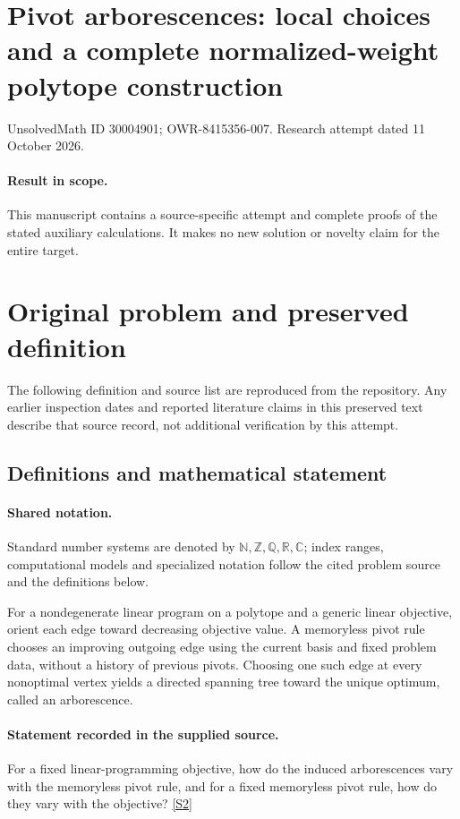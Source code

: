 \documentclass[11pt]{article}
\begin{document}
\section*{Pivot arborescences: local choices and a complete normalized-weight polytope construction}
\noindent UnsolvedMath ID 30004901; OWR-8415356-007. Research attempt dated 11 October 2026.
\paragraph{Result in scope.}This manuscript contains a source-specific attempt and complete proofs of the stated auxiliary calculations. It makes no new solution or novelty claim for the entire target.
\section{Original problem and preserved definition}
The following definition and source list are reproduced from the repository. Any earlier inspection dates and reported literature claims in this preserved text describe that source record, not additional verification by this attempt.
\subsection{Definitions and mathematical statement}

\paragraph{Shared notation.}Standard number systems are denoted by $\mathbb N,\mathbb Z,\mathbb Q,\mathbb R,\mathbb C$; index ranges, computational models and specialized notation follow the cited problem source and the definitions below.


For a nondegenerate linear program on a polytope and a generic linear objective, orient each edge toward decreasing objective value. A memoryless pivot rule chooses an improving outgoing edge using the current basis and fixed problem data, without a history of previous pivots. Choosing one such edge at every nonoptimal vertex yields a directed spanning tree toward the unique optimum, called an arborescence.
\paragraph{Statement recorded in the supplied source.}
For a fixed linear-programming objective, how do the induced arborescences vary with the memoryless pivot rule, and for a fixed memoryless pivot rule, how do they vary with the objective? \href{https://doi.org/10.4171/owr/2021/53}{[S2]}
\end{document}
